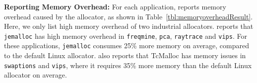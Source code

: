 \begin{table}[htbp]
\centering
{}
   \caption{ \MP{} reports the percentage of different memory overhead, including internal fragmentation, external fragmentation, memory blowup, and real memory usage. The table also shows the total memory consumption with the unit of MB, except swaptions. \label{tbl:memoryoverheadResult}}
\end{table}


\textbf{Reporting Memory Overhead:} 
For each application, \MP{} reports memory overhead caused by the allocator, as shown in Table~\ref{tbl:memoryoverheadResult}. Here, we only list high memory overhead of two industrial allocators. \MP{} reports that \texttt{jemalloc} has high memory overhead in \texttt{freqmine}, \texttt{pca}, \texttt{raytrace} and \texttt{vips}. For these applications, \texttt{jemalloc} consumes 25\% more memory on average, compared to the default Linux allocator. \MP{} also reports that TcMalloc has memory issues in \texttt{swaptions} and \texttt{vips}, where it requires 35\% more memory than the default Linux allocator on average. 

